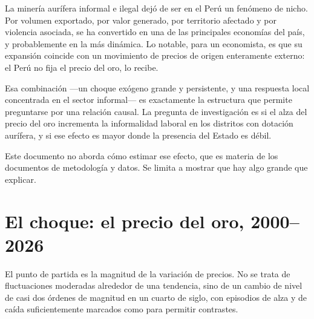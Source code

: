 \documentclass[11pt,a4paper]{article}
\begin{document}
La minería aurífera informal e ilegal dejó de ser en el Perú un fenómeno de nicho. Por volumen exportado, por valor generado, por territorio afectado y por violencia asociada, se ha convertido en una de las principales economías del país, y probablemente en la más dinámica. Lo notable, para un economista, es que su expansión coincide con un movimiento de precios de origen enteramente externo: el Perú no fija el precio del oro, lo recibe.

Esa combinación ---un choque exógeno grande y persistente, y una respuesta local concentrada en el sector informal--- es exactamente la estructura que permite preguntarse por una relación causal. La pregunta de investigación es si el alza del precio del oro incrementa la informalidad laboral en los distritos con dotación aurífera, y si ese efecto es mayor donde la presencia del Estado es débil.

Este documento no aborda cómo estimar ese efecto, que es materia de los documentos de metodología y datos. Se limita a mostrar que hay algo grande que explicar.

\section{El choque: el precio del oro, 2000--2026}

El punto de partida es la magnitud de la variación de precios. No se trata de fluctuaciones moderadas alrededor de una tendencia, sino de un cambio de nivel de casi dos órdenes de magnitud en un cuarto de siglo, con episodios de alza y de caída suficientemente marcados como para permitir contrastes.
\end{document}
